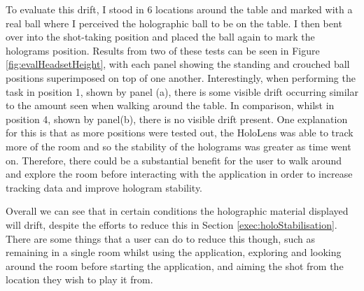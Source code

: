 \documentclass[ %
                author={Finn Alexander Wilkinson},
                supervisor={Dr. Andrew Calway},
                degree={MEng},
                title={\centering A Mixed Reality Aim Assistant for Pool and Snooker},
                subtitle={},
                type={Enterprise},
                year={2021} ]{dissertation}
\begin{document}
To evaluate this drift, I stood in 6 locations around the table and marked with a real ball where I perceived the holographic ball to be on the table. I then bent over into the shot-taking position and placed the ball again to mark the holograms position. Results from two of these tests can be seen in Figure \ref{fig:evalHeadsetHeight}, with each panel showing the standing and crouched ball positions superimposed on top of one another. Interestingly, when performing the task in position 1, shown by panel (a), there is some visible drift occurring similar to the amount seen when walking around the table. In comparison, whilst in position 4, shown by panel(b), there is no visible drift present. One explanation for this is that as more positions were tested out, the HoloLens was able to track more of the room and so the stability of the holograms was greater as time went on. Therefore, there could be a substantial benefit for the user to walk around and explore the room before interacting with the application in order to increase tracking data and improve hologram stability.\\\par

Overall we can see that in certain conditions the holographic material displayed will drift, despite the efforts to reduce this in Section \ref{exec:holoStabilisation}. There are some things that a user can do to reduce this though, such as remaining in a single room whilst using the application, exploring and looking around the room before starting the application, and aiming the shot from the location they wish to play it from.
\end{document}
